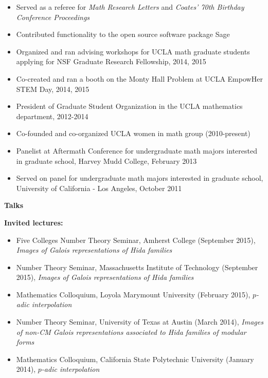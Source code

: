 \documentclass[10pt]{article}
\theoremstyle{plain} \numberwithin{equation}{section}
\theoremstyle{definition}
\newcounter{list}
\begin{document}
\begin{itemize}

\item[] Served as a referee for \textit{Math Research Letters} and \textit{Coates' 70th Birthday Conference Proceedings}
\item[] Contributed functionality to the open source software package Sage
\item[] Organized and ran advising workshops for UCLA math graduate students applying for NSF Graduate Research Fellowship, 2014, 2015
\item[] Co-created and ran a booth on the Monty Hall Problem at UCLA EmpowHer STEM Day, 2014, 2015
\item[] President of Graduate Student Organization in the UCLA mathematics department, 2012-2014
\item[] Co-founded and co-organized UCLA women in math group (2010-present)
\item[] Panelist at Aftermath Conference for undergraduate math majors interested in graduate school, Harvey Mudd College, February 2013
\item[] Served on panel for undergraduate math majors interested in graduate school, University of California - Los Angeles, October 2011
\end{itemize}

\medskip

{\large\textbf{Talks}}

\textbf{Invited lectures:}
\begin{itemize}
\item[] Five Colleges Number Theory Seminar, Amherst College (September 2015), \textit{Images of Galois representations of Hida families}
\item[] Number Theory Seminar, Massachusetts Institute of Technology (September 2015), \textit{Images of Galois representations of Hida families}
\item[] Mathematics Colloquium, Loyola Marymount University (February 2015), \textit{$p$-adic interpolation}
\item[] Number Theory Seminar, University of Texas at Austin (March 2014), \textit{Images of non-CM Galois representations associated to Hida families of modular forms}
\item[] Mathematics Colloquium, California State Polytechnic University (January 2014), \textit{$p$-adic interpolation}
\end{itemize}
\end{document}
